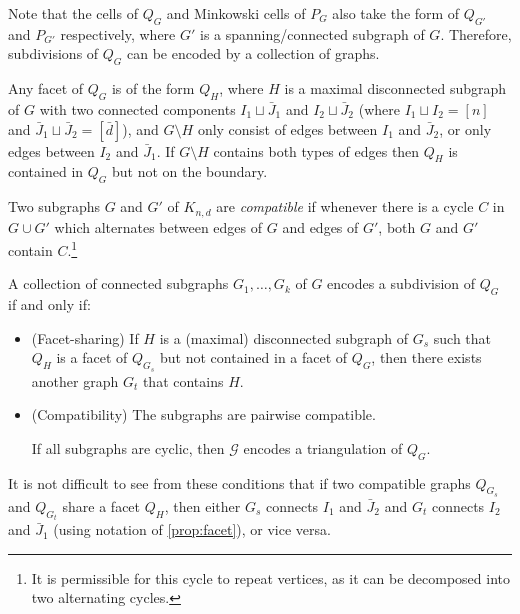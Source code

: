 \documentclass[letterpaper,reqno,11pt]{amsart}
\begin{document}
Note that the cells of $Q_G$ and Minkowski cells of $P_G$ also take the form of $Q_{G'}$ and $P_{G'}$ respectively, where $G'$ is a spanning/connected subgraph of $G$. Therefore, subdivisions of $Q_G$ can be encoded by a collection of graphs.

\begin{proposition}\label{prop:facet}
    Any facet of $Q_G$ is of the form $Q_H$, where $H$ is a maximal disconnected subgraph of $G$ with two connected components $I_1\sqcup \bar{J}_1$ and $I_2\sqcup \bar{J}_2$ (where $I_1\sqcup I_2 = [n]$ and $\bar{J}_1\sqcup \bar{J}_2 = [\bar{d}]$), and $G\setminus H$ only consist of edges between $I_1$ and $\bar{J}_2$, or only edges between $I_2$ and $\bar{J}_1$. If $G\setminus H$ contains both types of edges then $Q_H$ is contained in $Q_G$ but not on the boundary.
\end{proposition}

\begin{definition}
    Two subgraphs $G$ and $G'$ of $K_{n,d}$ are \emph{compatible} if whenever there is a cycle $C$ in $G\cup G'$ which alternates between edges of $G$ and edges of $G'$, both $G$ and $G'$ contain $C$.\footnote{It is permissible for this cycle to repeat vertices, as it can be decomposed into two alternating cycles.}
\end{definition}

\begin{theorem}\label{thm:subdiv_graphs}
A collection of connected subgraphs $G_1, \dots, G_k$ of $G$ encodes a subdivision of $Q_G$ if and only if:
\begin{itemize} 
\item (Facet-sharing) If $H$ is a (maximal) disconnected subgraph of $G_s$ such that $Q_{H}$ is a facet of $Q_{G_s}$ but not contained in a facet of $Q_G$, then there exists another graph $G_t$ that contains $H$.
\item (Compatibility) The subgraphs are pairwise compatible.

If all subgraphs are cyclic, then $\mathcal{G}$ encodes a triangulation of $Q_G$.
\end{itemize}
\end{theorem}

\begin{remark}\label{rem:alt_connect}
    It is not difficult to see from these conditions that if two compatible graphs $Q_{G_s}$ and $Q_{G_t}$ share a facet $Q_H$, then either $G_s$ connects $I_1$ and $\bar{J}_2$ and $G_t$ connects $I_2$ and $\bar{J}_1$ (using notation of \cref{prop:facet}), or vice versa.
\end{remark}
\end{document}
